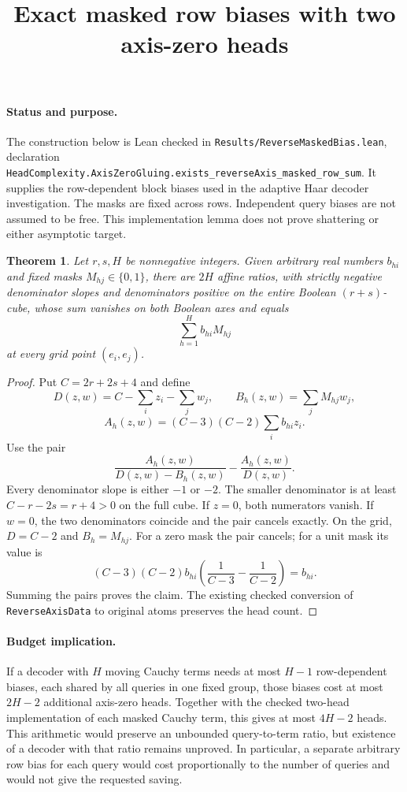 \documentclass[11pt]{article}
\title{Exact masked row biases with two axis-zero heads}
\author{}
\date{}
\newtheorem{theorem}{Theorem}
\begin{document}
\maketitle

\paragraph{Status and purpose.}
The construction below is Lean checked in
\texttt{Results/ReverseMaskedBias.lean}, declaration
\texttt{HeadComplexity.AxisZeroGluing.exists\_reverseAxis\_masked\_row\_sum}.
It supplies the row-dependent block biases used in the adaptive Haar
decoder investigation. The masks are fixed across rows. Independent
query biases are not assumed to be free. This implementation lemma
does not prove shattering or either asymptotic target.

\begin{theorem}
Let $r,s,H$ be nonnegative integers. Given arbitrary real numbers
$b_{hi}$ and fixed masks $M_{hj}\in\{0,1\}$, there are $2H$ affine
ratios, with strictly negative denominator slopes and denominators
positive on the entire Boolean $(r+s)$-cube, whose sum vanishes on
both Boolean axes and equals
\[
 \sum_{h=1}^H b_{hi}M_{hj}
\]
at every grid point $(e_i,e_j)$.
\end{theorem}
\begin{proof}
Put $C=2r+2s+4$ and define
\[
 D(z,w)=C-\sum_i z_i-\sum_j w_j,\qquad
 B_h(z,w)=\sum_jM_{hj}w_j,
\]
\[
 A_h(z,w)=(C-3)(C-2)\sum_i b_{hi}z_i.
\]
Use the pair
\[
 \frac{A_h(z,w)}{D(z,w)-B_h(z,w)}
 -\frac{A_h(z,w)}{D(z,w)}.
\]
Every denominator slope is either $-1$ or $-2$. The smaller
denominator is at least $C-r-2s=r+4>0$ on the full cube.
If $z=0$, both numerators vanish. If $w=0$, the two denominators
coincide and the pair cancels exactly. On the grid, $D=C-2$ and
$B_h=M_{hj}$. For a zero mask the pair cancels; for a unit mask
its value is
\[
 (C-3)(C-2)b_{hi}
 \left(\frac1{C-3}-\frac1{C-2}\right)=b_{hi}.
\]
Summing the pairs proves the claim. The existing checked conversion
of \texttt{ReverseAxisData} to original atoms preserves the head count.
\end{proof}

\paragraph{Budget implication.}
If a decoder with $H$ moving Cauchy terms needs at most $H-1$
row-dependent biases, each shared by all queries in one fixed group,
those biases cost at most $2H-2$ additional axis-zero heads. Together
with the checked two-head implementation of each masked Cauchy term,
this gives at most $4H-2$ heads. This arithmetic would preserve an
unbounded query-to-term ratio, but existence of a decoder with that
ratio remains unproved. In particular, a separate arbitrary row bias
for each query would cost proportionally to the number of queries
and would not give the requested saving.
\end{document}
